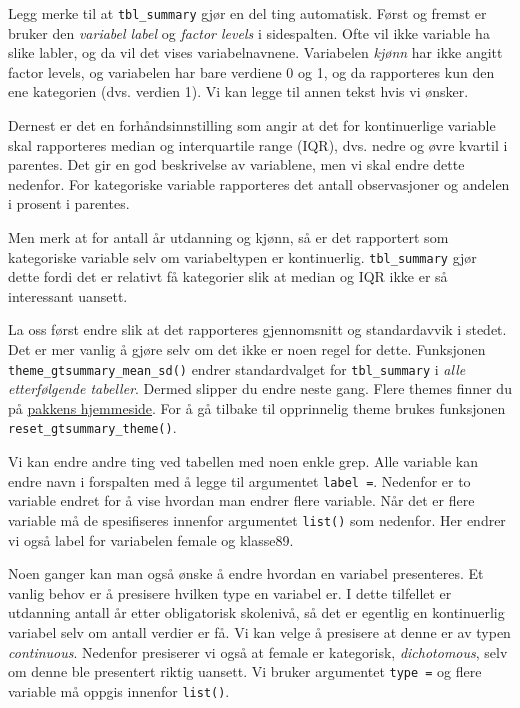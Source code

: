 \documentclass[
  norsk,
  letterpaper,
  DIV=11,
  numbers=noendperiod]{scrreprt}
\theoremstyle{definition}
\theoremstyle{remark}
\begin{document}
Legg merke til at \texttt{tbl\_summary} gjør en del ting automatisk.
Først og fremst er bruker den \emph{variabel label} og \emph{factor
levels} i sidespalten. Ofte vil ikke variable ha slike labler, og da vil
det vises variabelnavnene. Variabelen \emph{kjønn} har ikke angitt
factor levels, og variabelen har bare verdiene 0 og 1, og da rapporteres
kun den ene kategorien (dvs. verdien 1). Vi kan legge til annen tekst
hvis vi ønsker.

Dernest er det en forhåndsinnstilling som angir at det for kontinuerlige
variable skal rapporteres median og interquartile range (IQR), dvs.
nedre og øvre kvartil i parentes. Det gir en god beskrivelse av
variablene, men vi skal endre dette nedenfor. For kategoriske variable
rapporteres det antall observasjoner og andelen i prosent i parentes.

Men merk at for antall år utdanning og kjønn, så er det rapportert som
kategoriske variable selv om variabeltypen er kontinuerlig.
\texttt{tbl\_summary} gjør dette fordi det er relativt få kategorier
slik at median og IQR ikke er så interessant uansett.

La oss først endre slik at det rapporteres gjennomsnitt og standardavvik
i stedet. Det er mer vanlig å gjøre selv om det ikke er noen regel for
dette. Funksjonen \texttt{theme\_gtsummary\_mean\_sd()} endrer
standardvalget for \texttt{tbl\_summary} i \emph{alle etterfølgende
tabeller}. Dermed slipper du endre neste gang. Flere themes finner du på
\href{https://www.danieldsjoberg.com/gtsummary/articles/themes.html}{pakkens
hjemmeside}. For å gå tilbake til opprinnelig theme brukes funksjonen
\texttt{reset\_gtsummary\_theme()}.

Vi kan endre andre ting ved tabellen med noen enkle grep. Alle variable
kan endre navn i forspalten med å legge til argumentet
\texttt{label\ =}. Nedenfor er to variable endret for å vise hvordan man
endrer flere variable. Når det er flere variable må de spesifiseres
innenfor argumentet \texttt{list()} som nedenfor. Her endrer vi også
label for variabelen female og klasse89.

Noen ganger kan man også ønske å endre hvordan en variabel presenteres.
Et vanlig behov er å presisere hvilken type en variabel er. I dette
tilfellet er utdanning antall år etter obligatorisk skolenivå, så det er
egentlig en kontinuerlig variabel selv om antall verdier er få. Vi kan
velge å presisere at denne er av typen \emph{continuous}. Nedenfor
presiserer vi også at female er kategorisk, \emph{dichotomous}, selv om
denne ble presentert riktig uansett. Vi bruker argumentet
\texttt{type\ =} og flere variable må oppgis innenfor \texttt{list()}.
\end{document}
